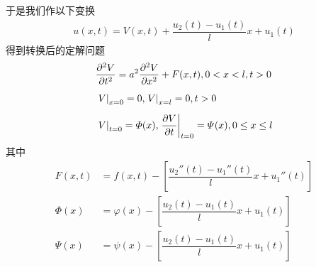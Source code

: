 于是我们作以下变换
\begin{align}
	u(x,t) = V(x,t) +  \dfrac{u_2(t) - u_1(t)}{l}x + u_1(t)
\end{align}
得到转换后的定解问题
\begin{align}
	&\dfrac{\partial^2 V}{\partial t^2} = a^2 \dfrac{\partial^2 V}{\partial x^2} + F(x,t), 0<x<l,t>0\notag \\[0.5em]
	& \left. V \right|_{x = 0} =0,  \left. V \right|_{x = l} = 0, t>0\\[0.5em]
	& \left. V \right|_{t = 0} = \varPhi(x), \left. \dfrac{\partial V}{\partial t}\right|_{t = 0} = \varPsi(x), 0 \le x \le l\notag
\end{align}
其中
\begin{align*}
	F(x,t) &= f(x,t) - \left[\dfrac{u_2''(t) - u_1''(t)}{l}x + u_1''(t) \right]\\[0.5em]
	\varPhi(x) &= \varphi(x) - \left[\dfrac{u_2(t) - u_1(t)}{l}x + u_1(t)  \right]\\[0.5em]
	\varPsi (x) &= \psi (x) - \left[\dfrac{u_2(t) - u_1(t)}{l}x + u_1(t) \right]
\end{align*}

